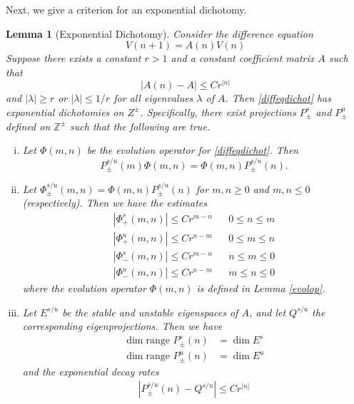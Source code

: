 \documentclass[12pt]{article}
\def\Z{{\mathbb Z}}
\newtheorem{lemma}{Lemma}
\begin{document}
Next, we give a criterion for an exponential dichotomy.

\begin{lemma}[Exponential Dichotomy]\label{dichotomy}
Consider the difference equation
\begin{equation}\label{diffeqdichot}
V(n+1) = A(n) V(n)
\end{equation}
Suppose there exists a constant $r > 1$ and a constant coefficient matrix $A$ such that 
\begin{equation}\label{Anexpdecay}
|A(n) - A| \leq C r^{|n|}
\end{equation}
and $|\lambda| \geq r$ or $|\lambda| \leq 1/r$ for all eigenvalues $\lambda$ of $A$. Then \eqref{diffeqdichot} has exponential dichotomies on $Z^\pm$. Specifically, there exist projections $P_\pm^s$ and $P_\pm^u$ defined on $\Z^\pm$ such that the following are true.
\begin{enumerate}[(i)]
\item Let $\Phi(m, n)$ be the evolution operator for \eqref{diffeqdichot}. Then 
\begin{equation}\label{projcommute}
P_\pm^{s/u}(m) \Phi(m, n) =  \Phi(m, n) P_\pm^{s/u}(n).
\end{equation}

\item Let $\Phi_\pm^{s/u}(m, n) = \Phi(m, n) P_\pm^{s/u}(n)$ for $m, n \geq 0$ and $m, n \leq 0$ (respectively). Then we have the estimates
\begin{align*}
|\Phi_+^s(m, n)| \leq C r^{m - n} && 0 \leq n \leq m \\
|\Phi_+^u(m, n)| \leq C r^{n - m} && 0 \leq m \leq n \\
|\Phi_-^s(m, n)| \leq C r^{m - n} && n \leq m \leq 0 \\
|\Phi_-^u(m, n)| \leq C r^{n - m} && m \leq n \leq 0
\end{align*}
where the evolution operator $\Phi(m, n)$ is defined in Lemma \ref{evolop}. 

\item Let $E^{s/u}$ be the stable and unstable eigenspaces of $A$, and let $Q^{s/u}$ the corresponding eigenprojections. Then we have
\begin{align*}
\dim \textrm{range }P_\pm^s(n) &= \dim E^s \\
\dim \textrm{range }P_\pm^u(n) &= \dim E^u
\end{align*}
and the exponential decay rates
\begin{align}\label{projexpdecay}
| P_\pm^{s/u}(n) - Q^{s/u} | \leq C r^{|n|}
\end{align}
\end{enumerate}


\end{lemma}
\end{document}
